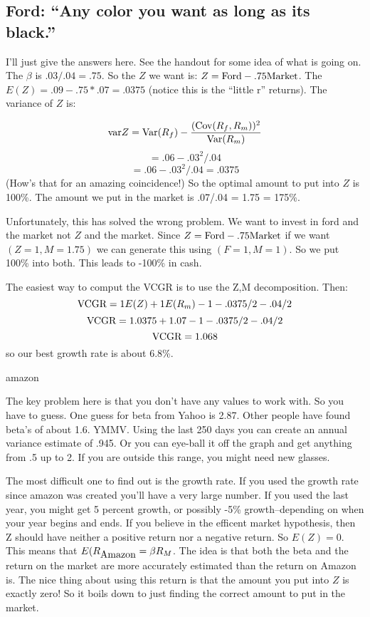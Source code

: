 \documentclass{article}
\begin{document}
\subsection*{Ford: ``Any color you want as long as its black.''}

I'll just give the answers here.  See the handout for some idea of
what is going on.  The $\beta$ is $.03/.04 = .75$.  So the $Z$ we want
is: $Z = \hbox{Ford} - .75 \hbox{Market}$.  The $E(Z) = .09 - .75 *
.07 = .0375$ (notice this is the ``little r'' returns).  The variance
of $Z$ is: 

$$\hbox{var}{Z} = \hbox{Var}(R_f) - \frac{(\hbox{Cov}(R_f,R_m))^2}{\hbox{Var}(R_m)} $$
$$  = .06 - .03^2/.04 $$
$$  = .06 - .03^2/.04 = .0375$$
(How's that for an amazing coincidence!)  So the optimal amount to put
into $Z$ is 100\%. The amount we put in the market is .07/.04 = 1.75 =
175\%. 

Unfortunately, this has solved the wrong problem.  We want to invest
in ford and the market not $Z$ and the market.  Since  $Z =
\hbox{Ford} - .75 \hbox{Market}$ if we want $(Z = 1, M = 1.75)$ we can
generate this using $(F = 1, M = 1)$.  So we put 100\% into both.
This leads to -100\% in cash.

The easiest way to comput the VCGR is to use the Z,M decomposition.
Then: 
$$\hbox{VCGR} = 1 E(Z) + 1 E(R_m) -1 - .0375/2 - .04/2$$
$$\hbox{VCGR} = 1.0375 + 1.07 -1 - .0375/2 - .04/2$$
$$\hbox{VCGR} = 1.068$$
so our best growth rate is about 6.8\%.  

\hbox{amazon}

The key problem here is that you don't have any values to work with.
So you have to guess.  One guess for beta from Yahoo is 2.87.  Other
people have found beta's of about 1.6.  YMMV.  Using the last 250 days
you can create an annual variance estimate of .945.  Or you can
eye-ball it off the graph and get anything from .5 up to 2.  If you
are outside this range, you might need new glasses.

The most difficult one to find out is the growth rate.  If you used
the growth rate since amazon was created you'll have a very large
number.  If you used the last year, you might get 5 percent growth, or
possibly -5\% growth--depending on when your year begins and ends.
If you believe in the efficent market hypothesis, then Z should have
neither a positive return nor a negative return.  So $E(Z) = 0$.  This
means that $E(R_{\hbox{Amazon}} = \beta R_M$.  The idea is that both
the beta and the return on the market are more accurately estimated
than the return on Amazon is.  The nice thing about using this return
is that the amount you put into $Z$ is exactly zero!  So it boils down
to just finding the correct amount to put in the market.
\end{document}

